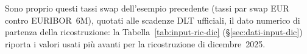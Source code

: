 \documentclass[11pt,a4paper]{article}
\theoremstyle{plain}
\theoremstyle{definition}
\theoremstyle{remark}
\newcommand{\UFR}{\mathrm{UFR}}
\newcommand{\FSP}{\mathrm{FSP}}
\begin{document}
Sono proprio questi tassi swap dell'esempio precedente (tassi par swap EUR contro
EURIBOR~6M), quotati alle scadenze DLT ufficiali, il dato numerico di
partenza della ricostruzione: la Tabella~\ref{tab:input-ric-dic} (\S\ref{sec:dati-input-dic})
riporta i valori usati pi\`u avanti per la ricostruzione di dicembre~2025. %

%
%
%
%
\end{document}
